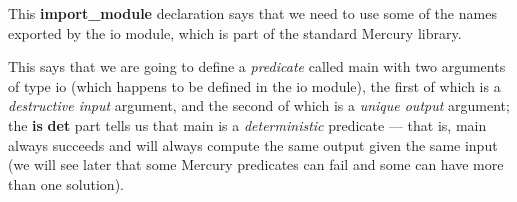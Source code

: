 \documentclass[a4paper,11pt,notitlepage,onecolumn]{book}
\begin{document}
This \textsf{\textbf{import\_module}} declaration says that we need to use some of the names
exported by the \textsf{io} module, which is part of the standard Mercury library.
\begin{small}

\begin{ptabular}
\nextline
\end{ptabular}

\end{small}
This says that we are going to define a \emph{predicate} called \textsf{main} with
two arguments of type \textsf{io} (which happens to be defined in the \textsf{io}
module), the first of which is a \emph{destructive input} argument, and the
second of which is a \emph{unique output} argument; the \textsf{\textbf{is} \textbf{det}} part
tells us that \textsf{main} is a \emph{deterministic} predicate --- that is,
\textsf{main} always succeeds and will always compute the same output given the
same input (we will see later that some Mercury predicates can fail and
some can have more than one solution).
\end{document}
